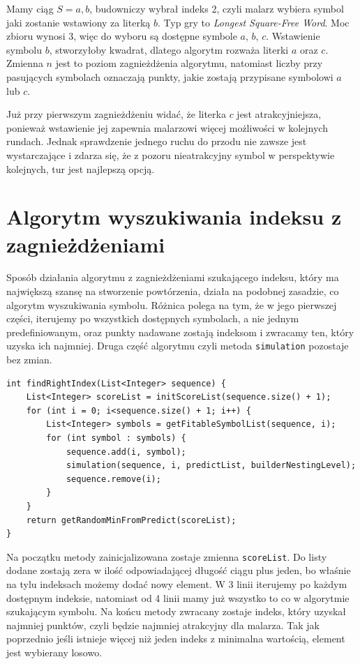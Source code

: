 \documentclass[document]{xmgr}
\begin{document}
Mamy ciąg $S = a, b$, budowniczy wybrał indeks 2, czyli malarz wybiera symbol jaki zostanie wstawiony za literką $b$. Typ gry to \emph{Longest Square-Free Word}. Moc zbioru wynosi 3, więc do wyboru są dostępne symbole $a$, $b$, $c$. Wstawienie symbolu $b$, stworzyłoby kwadrat, dlatego algorytm rozważa literki $a$ oraz $c$. Zmienna $n$ jest to poziom zagnieżdżenia algorytmu, natomiast liczby przy pasujących symbolach oznaczają punkty, jakie zostają przypisane symbolowi $a$ lub $c$. 

Już przy pierwszym zagnieżdżeniu widać, że literka $c$ jest atrakcyjniejsza, ponieważ wstawienie jej zapewnia malarzowi więcej możliwości w kolejnych rundach. Jednak sprawdzenie jednego ruchu do przodu nie zawsze jest wystarczające i zdarza się, że z pozoru nieatrakcyjny symbol w perspektywie kolejnych, tur jest najlepszą opcją.

\section{Algorytm wyszukiwania indeksu z zagnieżdżeniami}
Sposób działania algorytmu z zagnieżdżeniami szukającego indeksu, który ma największą szansę na stworzenie powtórzenia, działa na podobnej zasadzie, co algorytm wyszukiwania symbolu. Różnica polega na tym, że w jego pierwszej części, iterujemy po wszystkich dostępnych symbolach, a nie jednym predefiniowanym, oraz punkty nadawane zostają indeksom i zwracamy ten, który uzyska ich najmniej. Druga część algorytmu czyli metoda \texttt{simulation} pozostaje bez zmian.

\begin{lstlisting}[frame=single]
int findRightIndex(List<Integer> sequence) {
	List<Integer> scoreList = initScoreList(sequence.size() + 1);
	for (int i = 0; i<sequence.size() + 1; i++) {
		List<Integer> symbols = getFitableSymbolList(sequence, i);
		for (int symbol : symbols) {
			sequence.add(i, symbol);
			simulation(sequence, i, predictList, builderNestingLevel);
			sequence.remove(i);
		}
	}
	return getRandomMinFromPredict(scoreList);
}
\end{lstlisting}

Na początku metody zainicjalizowana zostaje zmienna \texttt{scoreList}. Do listy dodane zostają zera w ilość odpowiadającej długość ciągu plus jeden, bo właśnie na tylu indeksach możemy dodać nowy element. W 3 linii iterujemy po każdym dostępnym indeksie, natomiast od 4 linii mamy już wszystko to co w algorytmie szukającym symbolu. Na końcu metody zwracany zostaje indeks, który uzyskał najmniej punktów, czyli będzie najmniej atrakcyjny dla malarza. Tak jak poprzednio jeśli istnieje więcej niż jeden indeks z minimalna wartością, element jest wybierany losowo.
\end{document}
